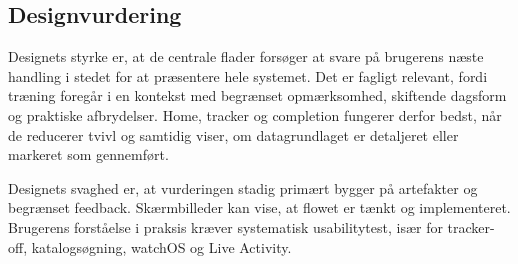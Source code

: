 \subsection{Designvurdering}

Designets styrke er, at de centrale flader forsøger at svare på brugerens næste handling i stedet for at præsentere hele systemet. Det er fagligt relevant, fordi træning foregår i en kontekst med begrænset opmærksomhed, skiftende dagsform og praktiske afbrydelser. Home, tracker og completion fungerer derfor bedst, når de reducerer tvivl og samtidig viser, om datagrundlaget er detaljeret eller markeret som gennemført.

Designets svaghed er, at vurderingen stadig primært bygger på artefakter og begrænset feedback. Skærmbilleder kan vise, at flowet er tænkt og implementeret. Brugerens forståelse i praksis kræver systematisk usabilitytest, især for tracker-off, katalogsøgning, watchOS og Live Activity.

